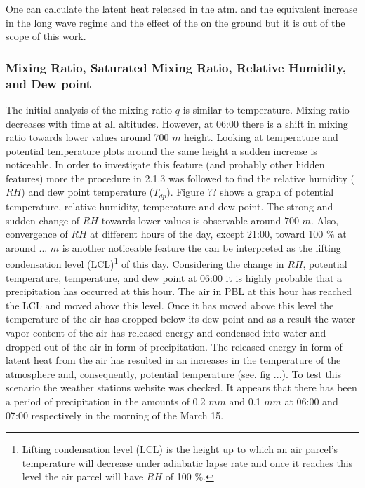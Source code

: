 \documentclass[a4paper,12pt]{article}
\numberwithin{equation}{section} %
\begin{document}
One can calculate the latent heat released in the atm. and the equivalent increase in the long wave regime and the effect of the on the ground but it is out of the scope of this work.

\subsubsection{Mixing Ratio, Saturated Mixing Ratio, Relative Humidity, and Dew point}

The initial analysis of the mixing ratio $q$ is similar to temperature. Mixing ratio decreases with time at all altitudes. However, at 06:00 there is a shift in mixing ratio towards lower values around 700 $m$ height. Looking at temperature and potential temperature plots around the same height a sudden increase is noticeable. In order to investigate this feature (and probably other hidden features) more the procedure in 2.1.3 was followed to find the relative humidity ($RH$) and dew point temperature ($T_{dp}$). Figure ?? shows a graph of potential temperature, relative humidity, temperature and dew point. The strong and sudden change of $RH$ towards lower values is observable around $700$ $m$. Also, convergence of $RH$ at different hours of the day, except 21:00, toward 100 $\%$ at around ... $m$ is another noticeable feature the can be interpreted as the lifting condensation level (LCL)\footnote{Lifting condensation level (LCL) is the height up to which an air parcel's temperature will decrease under adiabatic lapse rate and once it reaches this level the air parcel will have $RH$ of 100 $\%$.} of this day. Considering the change in $RH$, potential temperature, temperature, and dew point at 06:00 it is highly probable that a precipitation has occurred at this hour. The air in PBL at this hour has reached the LCL and moved above this level. Once it has moved above this level the temperature of the air has dropped below its dew point and as a result the water vapor content of the air has released energy and condensed into water and dropped out of the air in form of precipitation. The released energy in form of latent heat from the air has resulted in an increases in the temperature of the atmosphere and, consequently, potential temperature (see. fig ...). To test this scenario the weather stations website was checked. It appears that there has been a period of precipitation in the amounts of 0.2 $mm$ and 0.1 $mm$ at 06:00 and 07:00 respectively in the morning of the March 15.
 

\end{document}
